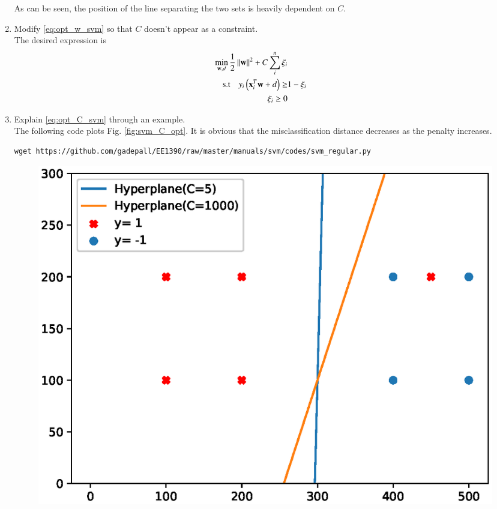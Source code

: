 \documentclass[journal,12pt,twocolumn]{IEEEtran}
\renewcommand\thesection{\arabic{section}}
\begin{document}
\begin{enumerate}[label=\thesection.\arabic*,ref=\thesection.\theenumi]
\begin{figure}[!ht]
\caption{}
\label{fig:svm_C_const}
\end{figure}
%
As can be seen, the position of the line separating the two sets is heavily dependent on $C$.
\item 	Modify \eqref{eq:opt_w_svm} so that $C$ doesn't appear as a constraint.
\\
\solution 
The desired expression is
\begin{align}
\label{eq:opt_C_svm}
\min_{\mathbf{w},d}\frac{1}{2}\left\Vert\mathbf{w}\right\Vert^2 + C \sum_{i}^{n}\xi_i
\\
\text{s.t} \quad  y_i\left(\mathbf{x}_i^T\mathbf{w}+d\right) \ge& 1 - \xi_i
\\
\xi_i \ge 0
\end{align}
\item Explain  \eqref{eq:opt_C_svm} through an example.
\\
\solution The following code plots Fig. \eqref{fig:svm_C_opt}.  It is obvious that the misclassification distance decreases as the penalty  increases.
\begin{lstlisting}
wget https://github.com/gadepall/EE1390/raw/master/manuals/svm/codes/svm_regular.py\end{lstlisting}

\begin{figure}[!ht]
\centering
\includegraphics[width=\columnwidth]{./figs/svm_C_opt.eps}
\caption{}
\label{fig:svm_C_opt}
\end{figure}
\end{enumerate}
\end{document}
